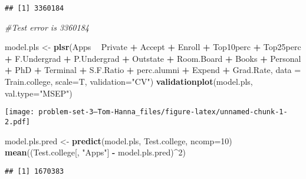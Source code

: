 \documentclass[
]{article}
\newenvironment{Shaded}{\begin{snugshade}}{\end{snugshade}}
\newcommand{\CommentTok}[1]{\textcolor[rgb]{0.56,0.35,0.01}{\textit{#1}}}
\newcommand{\DataTypeTok}[1]{\textcolor[rgb]{0.13,0.29,0.53}{#1}}
\newcommand{\DecValTok}[1]{\textcolor[rgb]{0.00,0.00,0.81}{#1}}
\newcommand{\KeywordTok}[1]{\textcolor[rgb]{0.13,0.29,0.53}{\textbf{#1}}}
\newcommand{\NormalTok}[1]{#1}
\newcommand{\OperatorTok}[1]{\textcolor[rgb]{0.81,0.36,0.00}{\textbf{#1}}}
\newcommand{\StringTok}[1]{\textcolor[rgb]{0.31,0.60,0.02}{#1}}
\begin{document}
\begin{verbatim}
## [1] 3360184
\end{verbatim}

\begin{Shaded}
\begin{Highlighting}[]
\CommentTok{#Test error is 3360184}

\NormalTok{model.pls <-}\StringTok{ }\KeywordTok{plsr}\NormalTok{(Apps }\OperatorTok{~}\StringTok{ }\NormalTok{Private }\OperatorTok{+}\StringTok{ }\NormalTok{Accept }\OperatorTok{+}\StringTok{ }\NormalTok{Enroll }\OperatorTok{+}\StringTok{ }\NormalTok{Top10perc }\OperatorTok{+}\StringTok{ }\NormalTok{Top25perc }\OperatorTok{+}\StringTok{ }\NormalTok{F.Undergrad }\OperatorTok{+}\StringTok{ }\NormalTok{P.Undergrad }\OperatorTok{+}\StringTok{ }\NormalTok{Outstate }\OperatorTok{+}
\StringTok{                      }\NormalTok{Room.Board }\OperatorTok{+}\StringTok{ }\NormalTok{Books }\OperatorTok{+}\StringTok{ }\NormalTok{Personal }\OperatorTok{+}\StringTok{ }\NormalTok{PhD }\OperatorTok{+}\StringTok{ }\NormalTok{Terminal }\OperatorTok{+}\StringTok{ }\NormalTok{S.F.Ratio }\OperatorTok{+}\StringTok{ }\NormalTok{perc.alumni }\OperatorTok{+}\StringTok{ }\NormalTok{Expend }\OperatorTok{+}\StringTok{ }\NormalTok{Grad.Rate,}
                  \DataTypeTok{data =}\NormalTok{ Train.college, }\DataTypeTok{scale=}\NormalTok{T, }\DataTypeTok{validation=}\StringTok{"CV"}\NormalTok{)}
\KeywordTok{validationplot}\NormalTok{(model.pls, }\DataTypeTok{val.type=}\StringTok{"MSEP"}\NormalTok{)}
\end{Highlighting}
\end{Shaded}

\texttt{[image: problem-set-3---Tom-Hanna\_files/figure-latex/unnamed-chunk-1-2.pdf]}

\begin{Shaded}
\begin{Highlighting}[]
\NormalTok{model.pls.pred <-}\StringTok{ }\KeywordTok{predict}\NormalTok{(model.pls, Test.college, }\DataTypeTok{ncomp=}\DecValTok{10}\NormalTok{)}
\KeywordTok{mean}\NormalTok{((Test.college[, }\StringTok{"Apps"}\NormalTok{] }\OperatorTok{-}\StringTok{ }\NormalTok{model.pls.pred)}\OperatorTok{^}\DecValTok{2}\NormalTok{)}
\end{Highlighting}
\end{Shaded}

\begin{verbatim}
## [1] 1670383
\end{verbatim}
\end{document}
